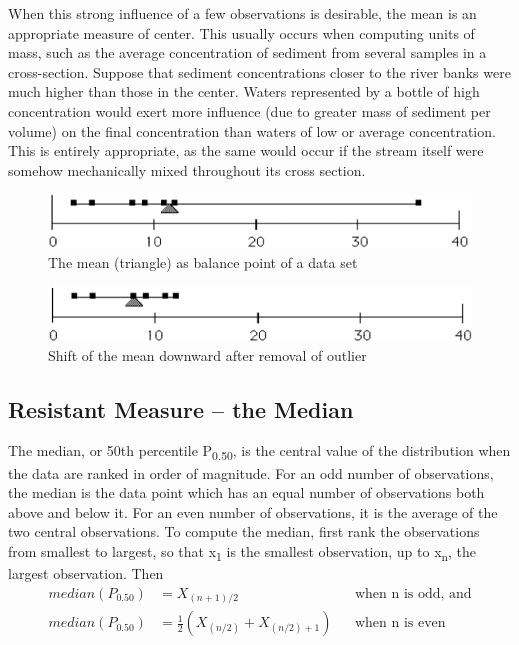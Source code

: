 \documentclass[]{book}
\begin{document}
When this strong influence of a few observations is desirable, the mean is an appropriate measure of center. This usually occurs when computing units of mass, such as the average concentration of sediment from several samples in a cross-section. Suppose that sediment
concentrations closer to the river banks were much higher than those in the center. Waters represented by a bottle of high concentration would exert more influence (due to greater mass of sediment per volume) on the final concentration than waters of low or average concentration. This is entirely appropriate, as the same would occur if the stream itself were somehow mechanically mixed throughout its cross section.

\begin{figure}

{\centering \includegraphics[width=7.4in]{figures/1_3_a} 

}

\caption{The mean (triangle) as balance point of a data set}\label{fig:fig-1-3-1}
\end{figure}
\begin{figure}

{\centering \includegraphics[width=7.25in]{figures/1_3_b} 

}

\caption{Shift of the mean downward after removal of outlier}\label{fig:fig-1-3-2}
\end{figure}

\hypertarget{resistant-measure-the-median}{%
\subsection{Resistant Measure -- the Median}\label{resistant-measure-the-median}}

The median, or 50th percentile P\textsubscript{0.50}, is the central value of the distribution when the data are ranked in order of magnitude. For an odd number of observations, the median is the data point which has an equal number of observations both above and below it. For an even number of observations, it is the average of the two central observations. To compute the median, first rank the observations from smallest to largest, so that x\textsubscript{1} is the smallest observation, up to x\textsubscript{n}, the largest observation. Then
\begin{equation}
\begin{aligned}
median \left(P_{0.50} \right) & = X_{(n+1)/2} && \text{when n is odd, and}\\
median \left(P_{0.50} \right) & = \frac{1}{2} \left( X_{(n/2)} +  X_{(n/2) + 1} \right) && \text{when n is even}
\end{aligned}
\label{eq:1-4}
\end{equation}
\end{document}
